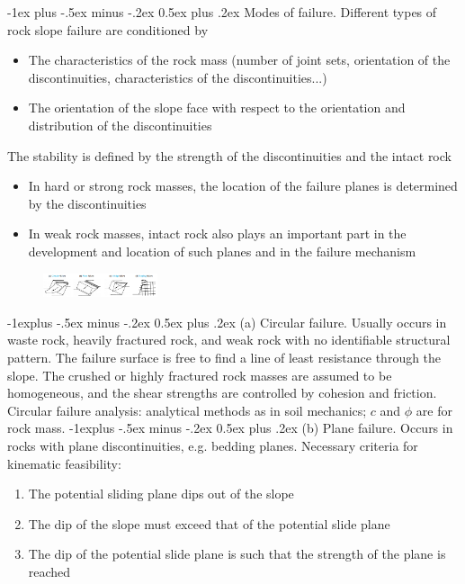 \documentclass[10pt,landscape,a4paper]{article}
\makeatletter
\renewcommand{\section}{\@startsection{section}{1}{0mm}%
	{-1ex plus -.5ex minus -.2ex}%
	{0.5ex plus .2ex}%
	{\normalfont\large\bfseries}}
\renewcommand{\subsection}{\@startsection{subsection}{2}{0mm}%
	{-1explus -.5ex minus -.2ex}%
	{0.5ex plus .2ex}%
	{\normalfont\normalsize\bfseries}}
\makeatother
\begin{document}
\begin{multicols}{3}
	\section{Modes of failure.}
	Different types of rock slope failure are conditioned by
	\begin{itemize}
		\item The characteristics of the rock mass (number of joint sets, orientation of the discontinuities, characteristics of the discontinuities...)
		\item The orientation of the slope face with respect to the orientation and distribution of the discontinuities
	\end{itemize}
	The stability is defined by the strength of the discontinuities and the intact rock
	\begin{itemize}
		\item In hard or strong rock masses, the location of the failure planes is determined by the discontinuities
		\item In weak rock masses, intact rock also plays an important part in the development and location of such planes and in the failure mechanism
	\end{itemize}
	\begin{figure}[H]
		\centering
		\includegraphics[width=0.3\textwidth]{modes-of-failure}
	\end{figure}
	\subsection{(a) Circular failure.}
	Usually occurs in waste rock, heavily fractured rock, and weak rock with no identifiable structural pattern.
	The failure surface is free to find a line of least resistance through the slope.
	The crushed or highly fractured rock masses are assumed to be homogeneous, and the shear strengths are controlled by cohesion and friction.
	Circular failure analysis: analytical methods as in soil mechanics; $c$ and $\phi$ are for rock mass.
	\subsection{(b) Plane failure.}
	Occurs in rocks with plane discontinuities, e.g. bedding planes.
	Necessary criteria for kinematic feasibility:
	\begin{enumerate}
		\item The potential sliding plane dips out of the slope
		\item The dip of the slope must exceed that of the potential slide plane
		\item The dip of the potential slide plane is such that the strength of the plane is reached
	\end{enumerate}

\end{multicols}
\end{document}

